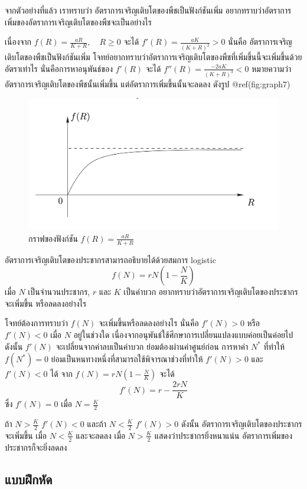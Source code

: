 \documentclass[
]{book}
\begin{document}
จากตัวอย่างที่แล้ว เราทราบว่า อัตราการเจริญเติบโตของพืชเป็นฟังก์ชันเพิ่ม
อยากทราบว่าอัตราการเพิ่มของอัตราการเจริญเติบโตของพืชจะเป็นอย่างไร

เนื่องจาก \(\displaystyle f(R)=\frac{aR}{K+R}, \quad R \ge 0\) จะได้
\(\displaystyle f'(R)=\frac{aK}{(K+R)^2}>0\) นั่นคือ
อัตราการเจริญเติบโตของพืชเป็นฟังก์ชันเพิ่ม
โจทย์อยากทราบว่าอัตราการเจริญเติบโตของพืชที่เพิ่มขึ้นนี้จะเพิ่มขึ้นด้วยอัตราเท่าไร
นั่นคือการหาอนุพันธ์ของ \(f'(R)\) จะได้
\(\displaystyle f''(R)=\frac{-2aK}{(K+R)^3}<0\)
หมายความว่าอัตราการเจริญเติบโตของพืชนั้นเพิ่มขึ้น แต่อัตราการเพิ่มขึ้นนั้นจะลดลง ดังรูป
@ref(fig:graph7)

\begin{figure}

{\centering \includegraphics[width=0.5\linewidth]{images/graph7} 

}

\caption{กราฟของฟังก์ชัน $f(R)=\frac{aR}{K+R}$}\label{fig:graph7}
\end{figure}

อัตราการเจริญเติบโตของประชากรสามารถอธิบายได้ด้วยสมการ logistic
\[f(N)=rN(1- \frac{N}{K})\] เมื่อ \(N\) เป็นจำนวนประชากร, \(r\) และ \(K\)
เป็นค่าบวก อยากทราบว่าอัตราการเจริญเติบโตของประชากรจะเพิ่มขึ้น หรือลดลงอย่างไร

โจทย์ต้องการทราบว่า \(f(N)\) จะเพิ่มขึ้นหรือลดลงอย่างไร นั่นคือ \(f'(N)>0\) หรือ
\(f'(N)<0\) เมื่อ \(N\) อยู่ในช่วงใด
เนื่องจากอนุพันธ์ใช้ศึกษาการเปลี่ยนแปลงแบบค่อยเป็นค่อยไป ดังนั้น \(f'(N)\)
จะเปลี่ยนจากค่าลบเป็นค่าบวก ย่อมต้องผ่านค่าศูนย์ก่อน การหาค่า \(N^*\) ที่ทำให้
\(f(N^*)=0\) ย่อมเป็นหนทางหนึ่งที่สามารถใช้พิจารณาช่วงที่ทำให้ \(f'(N)>0\) และ
\(f'(N)<0\) ได้ จาก \(\displaystyle f(N)=rN(1- \frac{N}{K})\) จะได้
\[f'(N)=r- \frac{2rN}{K}\] ซึ่ง \(f'(N)=0\) เมื่อ \(N = \frac{K}{2}\)

ถ้า \(\displaystyle N> \frac{K}{2}\) \(f'(N)<0\) และถ้า
\(\displaystyle N< \frac{K}{2}\) \(f'(N)>0\) ดังนั้น
อัตราการเจริญเติบโตของประชากรจะเพิ่มขึ้น เมื่อ \(\displaystyle N< \frac{K}{2}\)
และจะลดลง เมื่อ \(\displaystyle N> \frac{K}{2}\) แสดงว่าประชากรยิ่งหนาแน่น
อัตราการเพิ่มของประชากรก็จะยิ่งลดลง

\subsection{แบบฝึกหัด}\label{uxe41uxe1auxe1auxe1duxe01uxe2buxe14-5}
\end{document}
